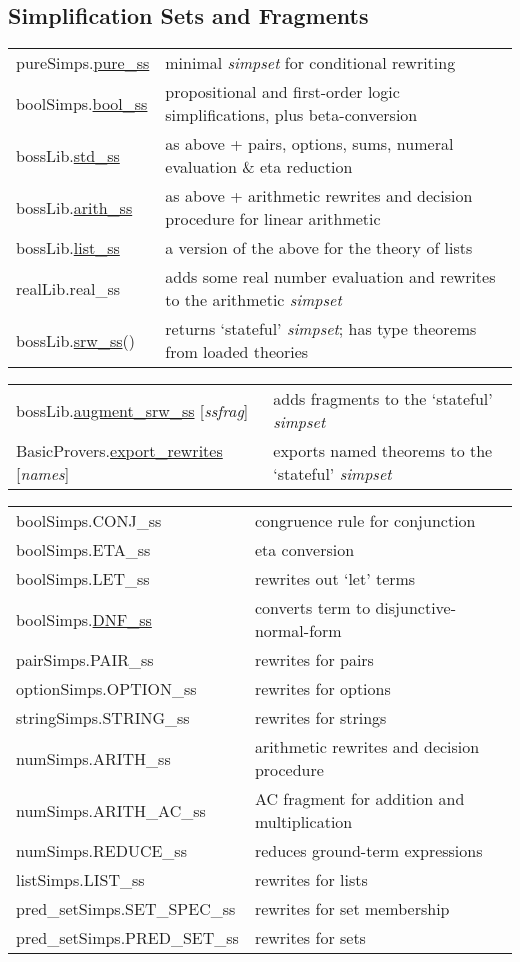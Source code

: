 \documentclass[landscape,10pt]{article}
\newcommand{\hol}[2]{{\sffamily #1.\href{http://hol-theorem-prover.org/kananaskis-12-helpdocs/help/Docfiles/HTML/#1.#2.html}{#2}}}
\newcommand{\holnoref}[2]{{\sffamily #1.#2}}
\newcommand{\var}[1]{{\emph{#1}}}
\begin{document}
\begin{multicols}{2}
\subsection*{Simplification Sets and Fragments}
\begin{tabular}{ll}
\hol{pureSimps}{pure_ss} & minimal \emph{simpset} for conditional rewriting \\
\hol{boolSimps}{bool_ss} & propositional and first-order logic simplifications, plus beta-conversion \\
\hol{bossLib}{std_ss} & as above + pairs, options, sums, numeral evaluation \& eta reduction \\
\hol{bossLib}{arith_ss} & as above + arithmetic rewrites and decision procedure for linear arithmetic \\
\hol{bossLib}{list_ss} & a version of the above for the theory of lists \\
\holnoref{realLib}{real_ss} & adds some real number evaluation and rewrites to the arithmetic \emph{simpset} \\
\hol{bossLib}{srw_ss}() & returns `stateful' \emph{simpset}; has type theorems from loaded theories
\end{tabular}

\medskip
\noindent\begin{tabular}{ll}
\hol{bossLib}{augment_srw_ss} [\var{ssfrag}] & adds fragments to the `stateful' \emph{simpset} \\
\hol{BasicProvers}{export_rewrites} [\var{names}] & exports named theorems to the `stateful' \emph{simpset} \\
\end{tabular}


\noindent\begin{tabular}{ll}
\holnoref{boolSimps}{CONJ_ss} & congruence rule for conjunction \\
\holnoref{boolSimps}{ETA_ss} & eta conversion \\
\holnoref{boolSimps}{LET_ss} & rewrites out `let' terms \\
\hol{boolSimps}{DNF_ss} & converts term to disjunctive-normal-form\\
\holnoref{pairSimps}{PAIR_ss} & rewrites for pairs \\
\holnoref{optionSimps}{OPTION_ss} & rewrites for options \\
\holnoref{stringSimps}{STRING_ss} & rewrites for strings \\
\holnoref{numSimps}{ARITH_ss} & arithmetic rewrites and decision procedure \\
\holnoref{numSimps}{ARITH_AC_ss} & AC fragment for addition and multiplication \\
\holnoref{numSimps}{REDUCE_ss} & reduces ground-term expressions \\
\holnoref{listSimps}{LIST_ss} & rewrites for lists \\
\holnoref{pred_setSimps}{SET_SPEC_ss} & rewrites for set membership \\
\holnoref{pred_setSimps}{PRED_SET_ss} & rewrites for sets \\
\end{tabular}
\end{multicols}
\end{document}
